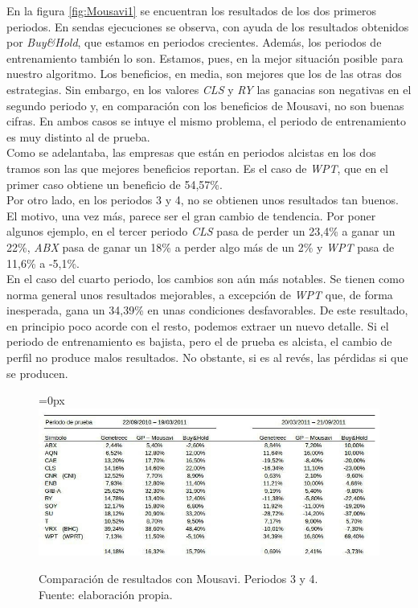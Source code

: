 En la figura \ref{fig:Mousavi1} se encuentran los resultados de los dos primeros periodos. En sendas ejecuciones se observa, con ayuda de los resultados obtenidos por \textit{Buy\&Hold}, que estamos en periodos crecientes. Adem\'as, los periodos de entrenamiento tambi\'en lo son. Estamos, pues, en la mejor situaci\'on posible para nuestro algoritmo. Los beneficios, en media, son mejores que los de las otras dos estrategias. Sin embargo, en los valores \textit{CLS} y \textit{RY} las ganacias son negativas en el segundo periodo y, en comparaci\'on con los beneficios de Mousavi, no son buenas cifras. En ambos casos se intuye el mismo problema, el periodo de entrenamiento es muy distinto al de prueba.\\

Como se adelantaba, las empresas que est\'an en periodos alcistas en los dos tramos son las que mejores beneficios reportan. Es el caso de \textit{WPT}, que en el primer caso obtiene un beneficio de 54,57\%.\\

Por otro lado, en los periodos 3 y 4, no se obtienen unos resultados tan buenos. El motivo, una vez m\'as, parece ser el gran cambio de tendencia. Por poner algunos ejemplo, en el tercer periodo \textit{CLS} pasa de perder un 23,4\% a ganar un 22\%, \textit{ABX} pasa de ganar un 18\% a perder algo m\'as de un 2\% y \textit{WPT} pasa de 11,6\% a -5,1\%.\\

En el caso del cuarto periodo, los cambios son a\'un m\'as notables. Se tienen como norma general unos resultados mejorables, a excepci\'on de \textit{WPT} que, de forma inesperada, gana un 34,39\% en unas condiciones desfavorables. De este resultado, en principio poco acorde con el resto, podemos extraer un nuevo detalle. Si el periodo de entrenamiento es bajista, pero el de prueba es alcista, el cambio de perfil no produce malos resultados. No obstante, si es al rev\'es, las p\'erdidas si que se producen.

     	\begin{figure}[H]
     		\centering\leftskip=0px
     		\includegraphics[scale=2]{imagenes/Mousavi2.jpg}
     		\caption[Comparaci\'on de resultados con Mousavi]{Comparaci\'on de resultados con Mousavi. Periodos 3 y 4. \\ Fuente: elaboraci\'on propia.}
     		\label{fig:Mousavi2}
     	\end{figure} 


